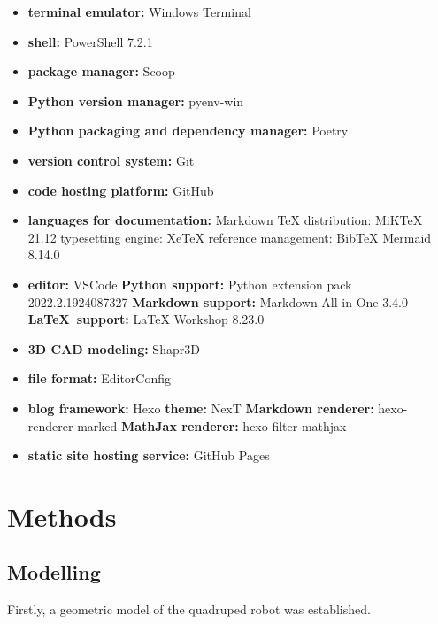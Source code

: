 \begin{itemize}
   \item \textbf{terminal emulator:} Windows Terminal
   \item \textbf{shell:} PowerShell 7.2.1
   \item \textbf{package manager:} Scoop
   \item \textbf{Python version manager:} pyenv-win
   \item \textbf{Python packaging and dependency manager:} Poetry
   \item \textbf{version control system:} Git
   \item \textbf{code hosting platform:} GitHub
   \item \textbf{languages for documentation:}
      \subitem Markdown
      \subitem \LaTeXe
         \subsubitem TeX distribution: MiKTeX 21.12
         \subsubitem typesetting engine: XeTeX
         \subsubitem reference management: BibTeX
      \subitem Mermaid 8.14.0
   \item \textbf{editor:} VSCode
      \subitem \textbf{Python support:} Python extension pack 2022.2.1924087327
      \subitem \textbf{Markdown support:} Markdown All in One 3.4.0
      \subitem \textbf{\LaTeX\ support:} LaTeX Workshop 8.23.0
   \item \textbf{3D CAD modeling:} Shapr3D
   \item \textbf{file format:} EditorConfig
   \item \textbf{blog framework:} Hexo
      \subitem \textbf{theme:} NexT
      \subitem \textbf{Markdown renderer:} hexo-renderer-marked
      \subitem \textbf{MathJax renderer:} hexo-filter-mathjax
   \item \textbf{static site hosting service:} GitHub Pages
\end{itemize}

\section{Methods}

\subsection{Modelling}

Firstly, a geometric model of the quadruped robot was established.


